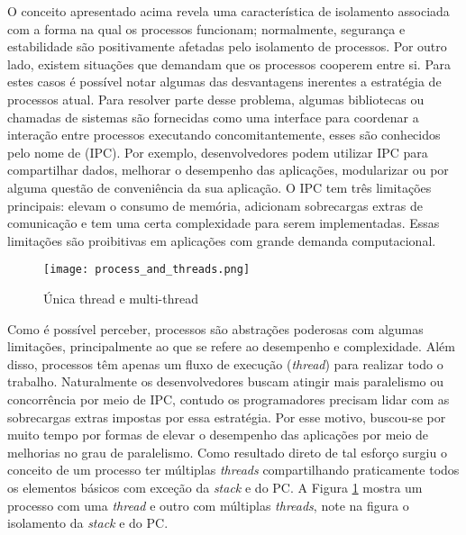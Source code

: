 O conceito apresentado acima revela uma característica de isolamento associada
com a forma na qual os processos funcionam; normalmente, segurança e
estabilidade são positivamente afetadas pelo isolamento de processos. Por outro
lado, existem situações que demandam que os processos cooperem entre si. Para
estes casos é possível notar algumas das desvantagens inerentes a estratégia de
processos atual. Para resolver parte desse problema, algumas bibliotecas ou
chamadas de sistemas são fornecidas como uma interface para coordenar a
interação entre processos executando concomitantemente, esses são conhecidos
pelo nome de  (IPC). Por exemplo,
desenvolvedores podem utilizar IPC para compartilhar dados, melhorar o
desempenho das aplicações, modularizar ou por alguma questão de conveniência da
sua aplicação. O IPC tem três limitações principais: elevam o consumo de
memória, adicionam sobrecargas extras de comunicação e tem uma certa
complexidade para serem implementadas. Essas limitações são proibitivas em
aplicações com grande demanda computacional.

\begin{figure}[!h]
  \centering
  \texttt{[image: process\_and\_threads.png]}
  \caption{Única thread e multi-thread~\citep{silberschatz}}
  \label{fig:single_thread_multi_thread}
\end{figure}

Como é possível perceber, processos são abstrações poderosas com algumas
limitações, principalmente ao que se refere ao desempenho e complexidade. Além
disso, processos têm apenas um fluxo de execução (\textit{thread}) para
realizar todo o trabalho. Naturalmente os desenvolvedores buscam atingir mais
paralelismo ou concorrência por meio de IPC, contudo os programadores precisam
lidar com as sobrecargas extras impostas por essa estratégia. Por esse
motivo, buscou-se por muito tempo por formas de elevar o desempenho das
aplicações por meio de melhorias no grau de paralelismo. Como resultado direto
de tal esforço surgiu o conceito de um processo ter múltiplas \emph{threads}
compartilhando praticamente todos os elementos básicos com exceção da
\emph{stack} e do PC. A Figura \ref{fig:single_thread_multi_thread} mostra um
processo com uma \emph{thread} e outro com múltiplas \emph{threads}, note na
figura o isolamento da \emph{stack} e do PC.



